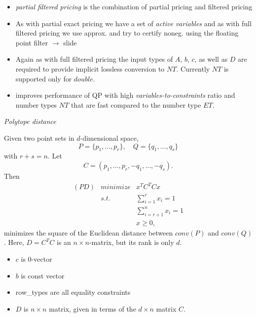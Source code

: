 \documentclass{slides}
\begin{document}
\begin{note}
\begin{itemize}
\item \emph{partial filtered pricing} is the combination of partial pricing
and filtered pricing
\item As with partial exact pricing we have a set of \emph{active variables} and
as with full filtered pricing we use approx. and try to certify noneg. using
the floating point filter $\rightarrow$ slide
\item Again as with full filtered pricing the input types of $A$, $b$, $c$,
as well as $D$ are required to provide implicit lossless conversion to $NT$.
Currently $NT$ is supported only for $double$. 
\item improves performance of QP with high \emph{variables-to-constraints}
ratio and number types $NT$ that are fast compared to the number type $ET$.
\end{itemize}
\end{note}


\begin{slide}
\emph{Polytope distance}

Given two point sets in $d$-dimensional space,
\[
P=\{p_{1}, \ldots, p_{r} \},
\quad
Q=\{q_{1}, \ldots, q_{s} \}
\]
with $r+s=n$. Let
\[
C=(p_{1}, \ldots , p_{r}, -q_{1}, \ldots, -q_{s}).
\]
Then 
\begin{eqnarray*}
(PD) & minimize & x^{T}C^{T}Cx  \\
     & s.t.     & \sum_{i=1}^{r}x_{i} = 1 \\
     &          & \sum_{i=r+1}^{n}x_{i} = 1 \\
     &          & x \geq 0,
\end{eqnarray*}
minimizes the square of the Euclidean distance between $conv(P)$ and $conv(Q)$.
Here, $D=C^{T}C$ is an
$n \times n$-matrix, but its rank is only $d$.
\end{slide}

\begin{note}
\begin{itemize}
\item $c$ is $0$-vector
\item $b$ is const vector
\item row\_types are all equality constraints
\item $D$ is $n \times n$ matrix, given in terms of the $d \times n$
matrix $C$.  
\end{itemize}
\end{note}
\end{document}
